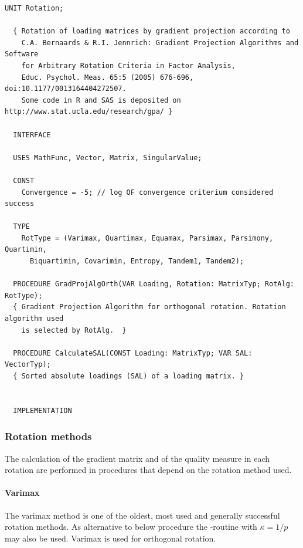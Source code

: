 \begin{lstlisting}[caption=Interface of unit Rotation]
  UNIT Rotation;

  { Rotation of loading matrices by gradient projection according to
    C.A. Bernaards & R.I. Jennrich: Gradient Projection Algorithms and Software
    for Arbitrary Rotation Criteria in Factor Analysis,
    Educ. Psychol. Meas. 65:5 (2005) 676-696, doi:10.1177/0013164404272507.
    Some code in R and SAS is deposited on http://www.stat.ucla.edu/research/gpa/ }

  INTERFACE

  USES MathFunc, Vector, Matrix, SingularValue;

  CONST
    Convergence = -5; // log OF convergence criterium considered success

  TYPE
    RotType = (Varimax, Quartimax, Equamax, Parsimax, Parsimony, Quartimin,
      Biquartimin, Covarimin, Entropy, Tandem1, Tandem2);

  PROCEDURE GradProjAlgOrth(VAR Loading, Rotation: MatrixTyp; RotAlg: RotType);
  { Gradient Projection Algorithm for orthogonal rotation. Rotation algorithm used
    is selected by RotAlg.  }

  PROCEDURE CalculateSAL(CONST Loading: MatrixTyp; VAR SAL: VectorTyp);
  { Sorted absolute loadings (SAL) of a loading matrix. }


  IMPLEMENTATION
\end{lstlisting}

\subsubsection{Rotation methods}

The calculation of the gradient matrix and of the quality measure in each rotation are performed in procedures that depend on the rotation method used.

\paragraph{Varimax}

The varimax method \parencite{Kai-58} is one of the oldest, most used and generally successful rotation methods. As alternative to below procedure the -routine with \(\kappa = 1/p \) may also be used. Varimax is used for orthogonal rotation.

